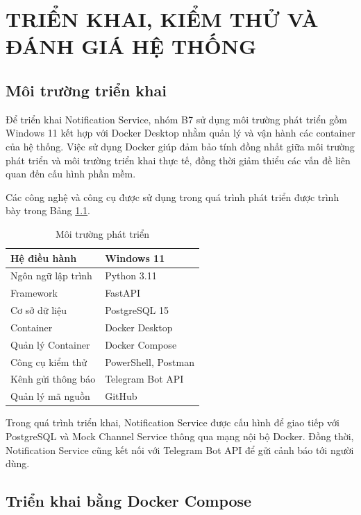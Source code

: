 \chapter{TRIỂN KHAI, KIỂM THỬ VÀ ĐÁNH GIÁ HỆ THỐNG}


\section{Môi trường triển khai}

Để triển khai Notification Service, nhóm B7 sử dụng môi trường phát triển gồm Windows 11 kết hợp với Docker Desktop nhằm quản lý và vận hành các container của hệ thống. Việc sử dụng Docker giúp đảm bảo tính đồng nhất giữa môi trường phát triển và môi trường triển khai thực tế, đồng thời giảm thiểu các vấn đề liên quan đến cấu hình phần mềm.

Các công nghệ và công cụ được sử dụng trong quá trình phát triển được trình bày trong Bảng \ref{tab:environment}.

\begin{table}[H]
\centering
\caption{Môi trường phát triển}
\label{tab:environment}
\begin{tabular}{|l|l|}
\hline
Hệ điều hành & Windows 11 \\ \hline
Ngôn ngữ lập trình & Python 3.11 \\ \hline
Framework & FastAPI \\ \hline
Cơ sở dữ liệu & PostgreSQL 15 \\ \hline
Container & Docker Desktop \\ \hline
Quản lý Container & Docker Compose \\ \hline
Công cụ kiểm thử & PowerShell, Postman \\ \hline
Kênh gửi thông báo & Telegram Bot API \\ \hline
Quản lý mã nguồn & GitHub \\ \hline
\end{tabular}
\end{table}

Trong quá trình triển khai, Notification Service được cấu hình để giao tiếp với PostgreSQL và Mock Channel Service thông qua mạng nội bộ Docker. Đồng thời, Notification Service cũng kết nối với Telegram Bot API để gửi cảnh báo tới người dùng.

\section{Triển khai bằng Docker Compose}

